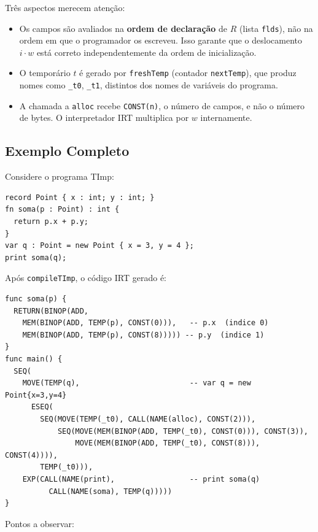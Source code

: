 Três aspectos merecem atenção:

\begin{itemize}
  \item Os campos são avaliados na \textbf{ordem de declaração} de \(R\)
    (lista \texttt{flds}), não na ordem em que o programador os escreveu.
    Isso garante que o deslocamento \(i \cdot w\) está correto
    independentemente da ordem de inicialização.
  \item O temporário \(t\) é gerado por \texttt{freshTemp} (contador
    \texttt{nextTemp}), que produz nomes como \texttt{\_t0}, \texttt{\_t1},
    distintos dos nomes de variáveis do programa.
  \item A chamada a \texttt{alloc} recebe \texttt{CONST(n)}, o número
    de campos, e não o número de bytes. O interpretador IRT multiplica
    por \(w\) internamente.
\end{itemize}

\subsection{Exemplo Completo}
\label{sec:ir-timp-example}

Considere o programa TImp:

\begin{verbatim}
record Point { x : int; y : int; }
fn soma(p : Point) : int {
  return p.x + p.y;
}
var q : Point = new Point { x = 3, y = 4 };
print soma(q);
\end{verbatim}

Após \texttt{compileTImp}, o código IRT gerado é:

\begin{verbatim}
func soma(p) {
  RETURN(BINOP(ADD,
    MEM(BINOP(ADD, TEMP(p), CONST(0))),   -- p.x  (indice 0)
    MEM(BINOP(ADD, TEMP(p), CONST(8))))) -- p.y  (indice 1)
}
func main() {
  SEQ(
    MOVE(TEMP(q),                         -- var q = new Point{x=3,y=4}
      ESEQ(
        SEQ(MOVE(TEMP(_t0), CALL(NAME(alloc), CONST(2))),
            SEQ(MOVE(MEM(BINOP(ADD, TEMP(_t0), CONST(0))), CONST(3)),
                MOVE(MEM(BINOP(ADD, TEMP(_t0), CONST(8))), CONST(4)))),
        TEMP(_t0))),
    EXP(CALL(NAME(print),                 -- print soma(q)
          CALL(NAME(soma), TEMP(q)))))
}
\end{verbatim}

Pontos a observar:

